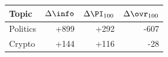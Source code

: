 \begin{tabular}{lrrr}
\toprule
Topic & $\Delta\info$ & $\Delta\PI_{100}$ & $\Delta\ovr_{100}$ \\
\midrule
Politics & +899 & +292 & -607 \\
Crypto & +144 & +116 & -28 \\
\bottomrule
\end{tabular}
